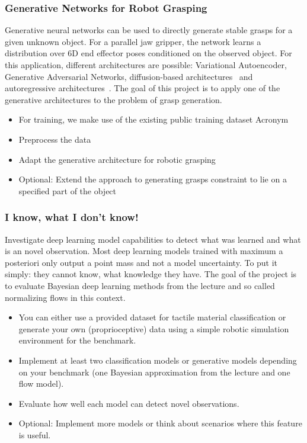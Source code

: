 \documentclass[a4paper]{article}
\begin{document}
\subsubsection{Generative Networks for Robot Grasping}
Generative neural networks can be used to directly generate stable grasps for a given unknown object.
For a parallel jaw gripper, the network learns a distribution over 6D end effector poses conditioned on the observed object.
For this application, different architectures are possible: Variational Autoencoder, Generative Adversarial Networks, diffusion-based architectures~\cite{ho2020denoising} and autoregressive architectures~\cite{winkelbauer2022}.
The goal of this project is to apply one of the generative architectures to the problem of grasp generation.
\begin{itemize}
  \item For training, we make use of the existing public training dataset Acronym~\cite{acronym2020}
  \item Preprocess the data
  \item Adapt the generative architecture for robotic grasping
  \item Optional: Extend the approach to generating grasps constraint to lie on a specified part of the object~\cite{lundell2023constrained}
\end{itemize}


\subsubsection{I know, what I don't know!}
Investigate deep learning model capabilities to detect what was learned and what is an novel observation.
Most deep learning models trained with maximum a posteriori only output a point mass and not a model uncertainty.
To put it simply: they cannot know, what knowledge they have. 
The goal of the project is to evaluate Bayesian deep learning methods from the lecture and so called normalizing flows \cite{mackowiak_generative_2021} in this context.

\begin{itemize}
  \item You can either use a provided dataset for tactile material classification or generate your own (proprioceptive) data using a simple robotic simulation environment for the benchmark.
  \item Implement at least two classification models or generative models depending on your benchmark (one Bayesian approximation from the lecture and one flow model).
  \item Evaluate how well each model can detect novel observations.
  \item Optional: Implement more models or think about scenarios where this feature is useful.
\end{itemize}
\end{document}

